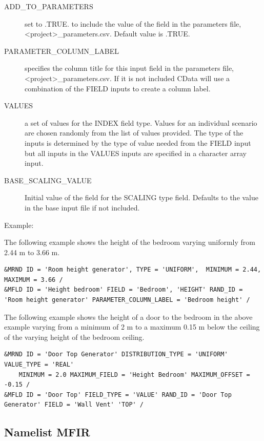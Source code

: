 \documentclass[12pt,twoside]{book}
\begin{document}
\begin{description}
  \item[ADD\_TO\_PARAMETERS] set to .TRUE. to include the value of the field in the parameters file, {\ct <project>\_parameters.csv}. Default value is .TRUE.
  \item[PARAMETER\_COLUMN\_LABEL] specifies the column title for this input field in the parameters file, {\ct <project>\_parameters.csv}. If it is not included CData will use a combination of the {\ct FIELD} inputs to create a column label.
  \item[VALUES] a set of values for the {\ct INDEX} field type. Values for an individual scenario are chosen randomly from the list of values provided. The type of the inputs is determined by the type of value needed from the {\ct FIELD} input but all inputs in the {\ct VALUES} inputs are specified in a character array input.
  \item[BASE\_SCALING\_VALUE] Initial value of the field for the {\ct SCALING} type field. Defaults to the value in the base input file if not included.
\end{description}

\vspace{\baselineskip}
\noindent Example:

The following example shows the height of the bedroom varying uniformly from 2.44 m to 3.66 m.
\begin{lstlisting}
&MRND ID = 'Room height generator', TYPE = 'UNIFORM',  MINIMUM = 2.44, MAXIMUM = 3.66 /
&MFLD ID = 'Height bedroom' FIELD = 'Bedroom', 'HEIGHT' RAND_ID = 'Room height generator' PARAMETER_COLUMN_LABEL = 'Bedroom height' /
\end{lstlisting}

The following example shows the height of a door to the bedroom in the above example varying from a minimum of 2 m to a maximum 0.15 m below the ceiling of the varying height of the bedroom ceiling.

\begin{lstlisting}
&MRND ID = 'Door Top Generator' DISTRIBUTION_TYPE = 'UNIFORM' VALUE_TYPE = 'REAL'
    MINIMUM = 2.0 MAXIMUM_FIELD = 'Height Bedroom' MAXIMUM_OFFSET = -0.15 /
&MFLD ID = 'Door Top' FIELD_TYPE = 'VALUE' RAND_ID = 'Door Top Generator' FIELD = 'Wall Vent' 'TOP' /
\end{lstlisting}


\clearpage

\subsection{Namelist MFIR}
\label{info:MFIR}
\end{document}
